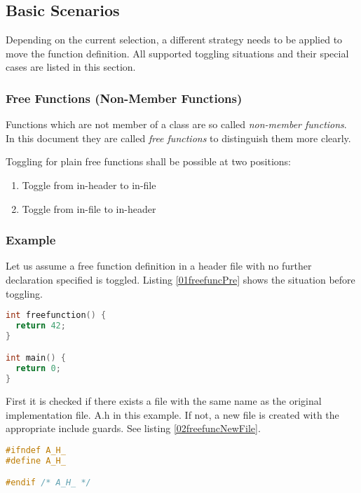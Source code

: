 \subsection{Basic Scenarios}

Depending on the current selection, a different strategy needs to be applied
to move the function definition. All supported toggling situations and their 
special cases are listed in this section.

\subsubsection{Free Functions (Non-Member Functions)}
Functions which are not member of a class are so called \textit{non-member
functions}. In this document they are called \textit{free functions} to
distinguish them more clearly.

Toggling for plain free functions shall be possible at two positions:
\begin{enumerate}
\item Toggle from in-header to in-file
\item Toggle from in-file to in-header
\end{enumerate}

\subsubsection*{Example}
Let us assume a free function definition in a header file with no further
declaration specified is toggled. Listing \nolinebreak\ref{01freefuncPre} shows
the situation before toggling. 

\begin{lstlisting}[caption={A.cpp, initial situation},
label={01freefuncPre},language=C++]
int freefunction() {
  return 42;
}

int main() {
  return 0;
}
\end{lstlisting}

First it is checked if there exists a file with the same name as the original
implementation file. A.h in this example. If not, a new file is created
with the appropriate include guards. See listing
\nolinebreak\ref{02freefuncNewFile}.

\begin{lstlisting}[caption={Newly created A.h}, label={02freefuncNewFile},
language=C++]
#ifndef A_H_
#define A_H_

#endif /* A_H_ */
\end{lstlisting}

